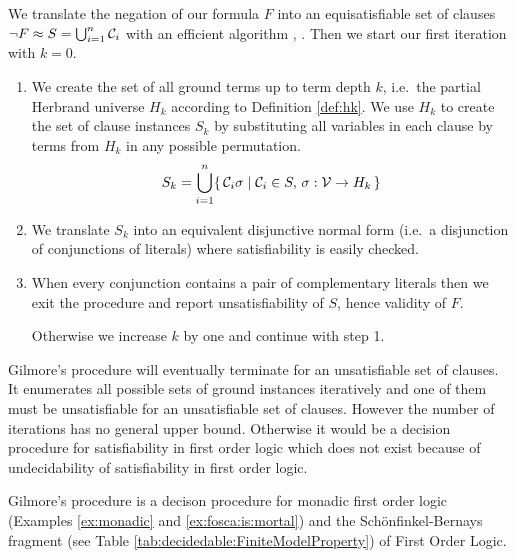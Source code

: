 \begin{procedure}\label{proc:gilmore's:prover}
	We translate the negation of our formula $F$ into an equisatisfiable set of clauses 
	$\lnot F \approx S = \bigcup_{i=1}^{n} {\mathcal C}_i$ with an efficient algorithm \cite{tseitin70}, \cite{PLAISTED1986293}.
	Then we start our first iteration with $k=0$.
	\begin{enumerate}
		
		\item We create the set of all ground terms up to term depth $k$, 
		i.e.~the partial Herbrand universe $H_k$ according to Definition \ref{def:hk}. 
		We use $H_k$ to create the set of clause instances $S_k$ 
		by substituting all variables 
		in each clause by terms from $H_k$ in any possible permutation.
		\[ S_k = \bigcup_{i=1}^{n} 
		\{\,
		{\mathcal C}_i\sigma \mid {\mathcal C}_i \in S,\,\sigma: {\mathcal V}\to H_k
		\,\}
		\]
		
		\item We translate $S_k$ into an equivalent disjunctive normal form 
		(i.e.~a disjunction of conjunctions of literals)
		where satisfiability is easily checked.
		
		
		
		\item When every conjunction contains a pair of complementary literals 
		then we exit the procedure and report unsatisfiability of $S$, 
		hence validity of $F$.
		
		Otherwise we increase $k$ by one and continue with step 1.
	\end{enumerate}
\end{procedure}

Gilmore's procedure will eventually terminate for an unsatisfiable set of clauses.
It enumerates all possible sets of ground instances iteratively
and one of them must be unsatisfiable for an unsatisfiable set of clauses. 
However the number of iterations has no general upper bound. 
Otherwise it would be a decision procedure for satisfiability in first order logic
which does not exist because of undecidability of satisfiability in first order logic.

\begin{lemma}
	Gilmore's procedure is a decison procedure for monadic first order logic 
	(Examples \ref{ex:monadic}  and \ref{ex:fosca:is:mortal})
	and the Schönfinkel-Bernays fragment (see Table \ref{tab:decidedable:FiniteModelProperty}) 
	of First Order Logic. 
\end{lemma}

